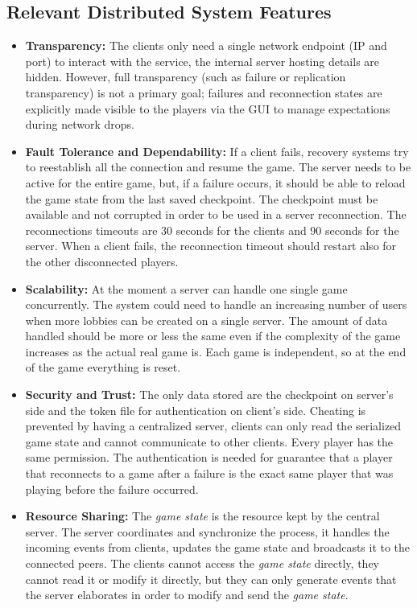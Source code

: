 \documentclass{scrartcl}
\begin{document}
\subsection{Relevant Distributed System Features}
\label{ds-features}

\begin{itemize}
  \item \textbf{Transparency:}
  The clients only need a single network endpoint (IP and port) to interact with the service,
  the internal server hosting details are hidden.
  However, full transparency (such as failure or replication transparency) is not a primary goal;
  failures and reconnection states are explicitly made visible to the players via the GUI to manage expectations during network drops.

  \item \textbf{Fault Tolerance and Dependability:}
  If a client fails, recovery systems try to reestablish all the connection and resume the game.
  The server needs to be active for the entire game, but, if a failure occurs,
  it should be able to reload the game state from the last saved checkpoint.
  The checkpoint must be available and not corrupted in order to be used in a server reconnection.
  The reconnections timeouts are 30 seconds for the clients and 90 seconds for the server.
  When a client fails, the reconnection timeout should restart also for the other disconnected players.

  \item \textbf{Scalability:}
  At the moment a server can handle one single game concurrently.
  The system could need to handle an increasing number of users when more lobbies can be created on a single server.
  The amount of data handled should be more or less the same even if the complexity of the game increases as the actual real game is.
  Each game is independent, so at the end of the game everything is reset.


  \item \textbf{Security and Trust:}
  The only data stored are the checkpoint on server's side and the token file for authentication on client's side.
  Cheating is prevented by having a centralized server, clients can only read the serialized game state and cannot communicate to other clients.
  Every player has the same permission.
  The authentication is needed for guarantee that a player that reconnects to a game after
  a failure is the exact same player that was playing before the failure occurred.

  \item \textbf{Resource Sharing:}
  The \textit{game state} is the resource kept by the central server.
  The server coordinates and synchronize the process, it handles the incoming events from clients,
  updates the game state and broadcasts it to the connected peers.
  The clients cannot access the \textit{game state} directly, they cannot read it or modify it directly,
  but they can only generate events that the server elaborates in order to modify and send the \textit{game state}.


\end{itemize}
\end{document}
